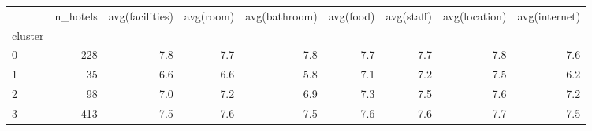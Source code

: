 \begin{tabular}{lrrrrrrrr}
\toprule
{} &  n\_hotels &  avg(facilities) &  avg(room) &  avg(bathroom) &  avg(food) &  avg(staff) &  avg(location) &  avg(internet) \\
cluster &           &                  &            &                &            &             &                &                \\
\midrule
0       &       228 &              7.8 &        7.7 &            7.8 &        7.7 &         7.7 &            7.8 &            7.6 \\
1       &        35 &              6.6 &        6.6 &            5.8 &        7.1 &         7.2 &            7.5 &            6.2 \\
2       &        98 &              7.0 &        7.2 &            6.9 &        7.3 &         7.5 &            7.6 &            7.2 \\
3       &       413 &              7.5 &        7.6 &            7.5 &        7.6 &         7.6 &            7.7 &            7.5 \\
\bottomrule
\end{tabular}

